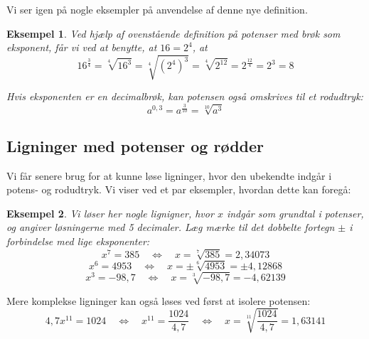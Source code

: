 \documentclass[12pt,oneside,a4paper]{article}
\theoremstyle{plain}
\newtheorem*{eks}{Eksempel}
\begin{document}
Vi ser igen på nogle eksempler på anvendelse af denne nye definition.
\begin{eks}
    Ved hjælp af ovenstående definition på potenser med brøk som eksponent,
    får vi ved at benytte, at $16=2^4$, at
    $$
    16^\frac34 = \sqrt[4]{16^3} = \sqrt[4]{\left(2^4\right)^3} = 
    \sqrt[4]{2^{12}} = 2^\frac{12}{4} = 2^3 = 8
    $$

    Hvis eksponenten er en decimalbrøk, kan potensen også omskrives til et rodudtryk:
    $$
    a^{0,3} = a^\frac{3}{10} = \sqrt[10]{a^3}
    $$
\end{eks}

\subsection*{Ligninger med potenser og rødder}

Vi får senere brug for at kunne løse ligninger, hvor den ubekendte indgår i
potens- og rodudtryk. Vi viser ved et par eksempler, hvordan dette kan foregå:

\begin{eks}
    Vi løser her nogle lignigner, hvor $x$ indgår som grundtal i potenser, og
    angiver løsningerne med 5 decimaler. Læg mærke til det dobbelte fortegn 
    $\pm$ i forbindelse med {\em lige} eksponenter:
    $$
    x^7 = 385 \quad\Leftrightarrow\quad x = \sqrt[7]{385} = 2,34073
    $$
    $$
    x^6 = 4953 \quad\Leftrightarrow\quad x = \pm \sqrt[6]{4953} = \pm 4,12868
    $$
    $$
    x^3 = -98,7 \quad\Leftrightarrow\quad x = \sqrt[3]{-98,7} = -4,62139
    $$
\end{eks}

Mere komplekse ligninger kan også løses ved først at isolere potensen:
$$
4,7 x^{11} = 1024 \quad \Leftrightarrow \quad
x^{11} = \frac{1024}{4,7} \quad \Leftrightarrow \quad
x = \sqrt[11]{\frac{1024}{4,7}} = 1,63141
$$
\end{document}

